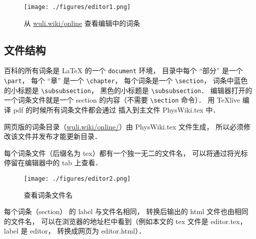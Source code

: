 \begin{figure}[ht]
\centering
\texttt{[image: ./figures/editor1.png]}
\caption{从 \href{http://wuli.wiki/online}{wuli.wiki/online} 查看编辑中的词条} \label{editor_fig1}
\end{figure}

\subsection{文件结构}

百科的所有词条是 LaTeX 的一个 \lstinline|document| 环境， 目录中每个 “部分” 是一个 \lstinline|\part|， 每个 “章” 是一个 \lstinline|\chapter|， 每个词条是一个 \lstinline|\section|， 词条中蓝色的小标题是 \lstinline|\subsubsection|， 黑色的小标题是 \lstinline|\subsubsection|． 编辑器打开的一个词条文件就是一个 section 的内容（不需要 \lstinline|\section| 命令）． 用 TeXlive 编译 pdf 的时候所有词条文件都会通过 \lstinline|| 插入到主文件 PhysWiki.tex 中．

网页版的词条目录（\href{http://wuli.wiki/online/}{wuli.wiki/online/}）由 PhysWiki.tex 文件生成， 所以必须修改该文件并发布才能更新目录．

每个词条文件（后缀名为 tex）都有一个独一无二的文件名， 可以将通过将光标停留在编辑器中的 tab 上查看．

\begin{figure}[ht]
\centering
\texttt{[image: ./figures/editor2.png]}
\caption{查看词条文件名} \label{editor_fig2}
\end{figure}

每个词条（section） 的 label 与文件名相同， 转换后输出的 html 文件也由相同的文件名， 可以在浏览器的地址栏中看到（例如本文的 tex 文件是 editor.tex， label 是 editor， 转换成网页为 editor.html）．

